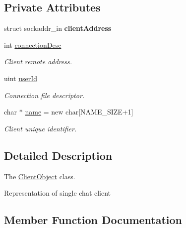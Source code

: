 \subsection*{Private Attributes}
\begin{DoxyCompactItemize}
\item 
\mbox{\label{classClientObject_a9f699539d7adac42a71e4bf6501c0c53}} 
struct sockaddr\+\_\+in {\bfseries client\+Address}
\item 
\mbox{\label{classClientObject_a6592e5413c789857a68b836c7b27c7b1}} 
int \hyperlink{classClientObject_a6592e5413c789857a68b836c7b27c7b1}{connection\+Desc}
\begin{DoxyCompactList}\small\item\em Client remote address. \end{DoxyCompactList}\item 
\mbox{\label{classClientObject_ab4b229b46fe32b699598051074a4f71b}} 
uint \hyperlink{classClientObject_ab4b229b46fe32b699598051074a4f71b}{user\+Id}
\begin{DoxyCompactList}\small\item\em Connection file descriptor. \end{DoxyCompactList}\item 
\mbox{\label{classClientObject_a29fa4c21633a35a7321e255e7ac10dbc}} 
char $\ast$ \hyperlink{classClientObject_a29fa4c21633a35a7321e255e7ac10dbc}{name} = new char\mbox{[}N\+A\+M\+E\+\_\+\+S\+I\+ZE+1\mbox{]}
\begin{DoxyCompactList}\small\item\em Client unique identifier. \end{DoxyCompactList}\end{DoxyCompactItemize}


\subsection{Detailed Description}
The \hyperlink{classClientObject}{Client\+Object} class. 

Representation of single chat client 

\subsection{Member Function Documentation}
\mbox{\label{classClientObject_a4704430f61bd85efd980c6ea083d5374}} 

